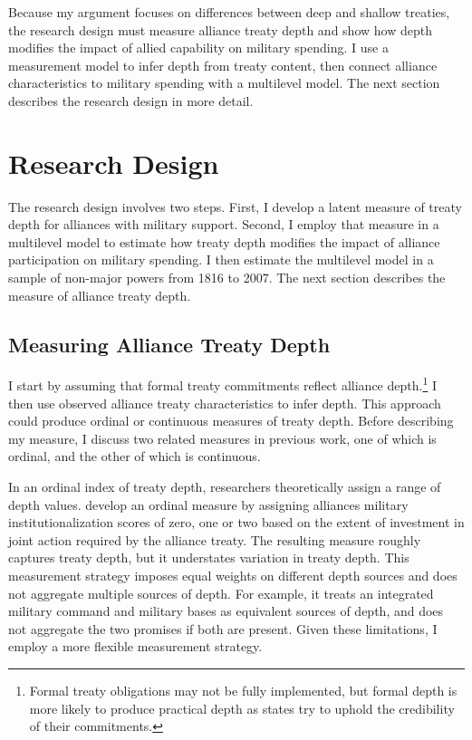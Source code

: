 \documentclass[12pt]{article}
\begin{document}
Because my argument focuses on differences between deep and shallow treaties, the research design must measure alliance treaty depth and show how depth modifies the impact of allied capability on military spending.  
I use a measurement model to infer depth from treaty content, then connect alliance characteristics to military spending with a multilevel model. 
The next section describes the research design in more detail. 



\section{Research Design} 


The research design involves two steps. 
First, I develop a latent measure of treaty depth for alliances with military support. 
Second, I employ that measure in a multilevel model to estimate how treaty depth modifies the impact of alliance participation on military spending. 
I then estimate the multilevel model in a sample of non-major powers from 1816 to 2007. 
The next section describes the measure of alliance treaty depth. 


\subsection{Measuring Alliance Treaty Depth} 


I start by assuming that formal treaty commitments reflect alliance depth.\footnote{Formal treaty obligations may not be fully implemented, but formal depth is more likely to produce practical depth as states try to uphold the credibility of their commitments.}
I then use observed alliance treaty characteristics to infer depth. 
This approach could produce ordinal or continuous measures of treaty depth.
Before describing my measure, I discuss two related measures in previous work, one of which is ordinal, and the other of which is continuous. 


In an ordinal index of treaty depth, researchers theoretically assign a range of depth values. 
\citep{LeedsAnac2005} develop an ordinal measure by assigning alliances military institutionalization scores of zero, one or two based on the extent of investment in joint action required by the alliance treaty. 
The resulting measure roughly captures treaty depth, but it understates variation in treaty depth. 
This measurement strategy imposes equal weights on different depth sources and does not aggregate multiple sources of depth. 
For example, it treats an integrated military command and military bases as equivalent sources of depth, and does not aggregate the two promises if both are present. 
Given these limitations, I employ a more flexible measurement strategy.
 
\end{document}
